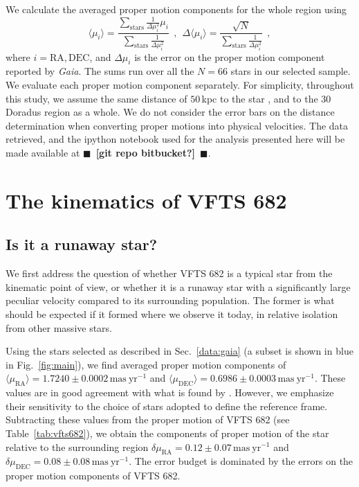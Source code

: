 \documentclass[apjl,twocolumn]{emulateapj}
\newcommand{\todo}[1]{{\large $\blacksquare$~\textbf{\color{red}[#1]}}~$\blacksquare$}
\DeclareRobustCommand{\Figref}[1]{Fig.~\ref{#1}}
\DeclareRobustCommand{\Tabref}[1]{Table~\ref{#1}}
\DeclareRobustCommand{\Secref}[1]{Sec.~\ref{#1}}
\begin{document}
We calculate the averaged proper motion components for the whole
region using 
\begin{equation}
  \label{eq:mean}
  \langle \mu_i\rangle = \frac{\sum_\mathrm{stars}\frac{1}{\Delta
      \mu_i^2}\mu_i}{\sum_\mathrm{stars} \frac{1}{\Delta \mu_i^2}} \ \ , \
  \ \Delta \langle \mu_i\rangle = \frac{\sqrt{N}}{\sum_\mathrm{stars}
    \frac{1}{\Delta \mu_i^2}} \ \ ,
\end{equation}
where $i = \mathrm{RA}, \mathrm{DEC}$, and $\Delta \mu_i$ is the error
on the proper motion component reported by \emph{Gaia}. The sums run over
all the $N=66$ stars in our selected sample. We evaluate each proper motion
component separately. For simplicity, throughout this study, we assume the same
distance of $50$\,kpc to the star \citep[][]{pietrzynski:13}, and to
the 30 Doradus region as a whole. We do not consider the error bars on
the distance determination when converting proper motions into
physical velocities. The data retrieved, and the ipython notebook used for the analysis
presented here will be made available at \todo{git repo bitbucket?}. 

\section{The kinematics of VFTS 682}
\label{sec:results}

\subsection{Is it a runaway star?}
\label{sec:runaway}
We first address the question of whether VFTS 682 is a typical star
from the kinematic point of view, or whether it is a runaway star with
a significantly large peculiar velocity compared to its surrounding population. The former is what should
be expected if it formed where we observe it today, in relative
isolation from other massive stars.

Using the stars selected as described in \Secref{data:gaia} (a
subset is shown in blue in \Figref{fig:main}), we find averaged proper motion components of
$\langle\mu_\mathrm{RA}\rangle = 1.7240\pm0.0002\,\mathrm{mas\ yr^{-1}}$ and
$\langle\mu_\mathrm{DEC}\rangle = 0.6986\pm0.0003\,\mathrm{mas\
  yr^{-1}}$. These values are
in good agreement with what is found by \cite{lennon:18}. However, we
emphasize their sensitivity to the choice of stars adopted to define
the reference frame. Subtracting these values from the
proper motion of VFTS 682 (see \Tabref{tab:vfts682}), we obtain the
components of proper motion of the star relative to the surrounding region
$\delta\mu_\mathrm{RA} = 0.12\pm 0.07\,\mathrm{mas\ yr^{-1}}$ and $\delta\mu_\mathrm{DEC} =
0.08\pm 0.08\,\mathrm{mas\ yr^{-1}}$. The error budget is
dominated by the errors on the proper motion components of VFTS 682.
\end{document}
